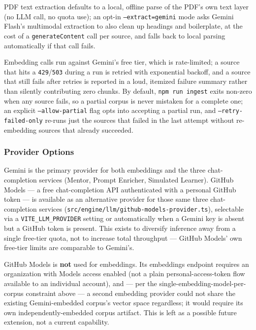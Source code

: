 \documentclass[10pt,letterpaper,twocolumn]{article}
\newcommand{\code}[1]{\texttt{\small #1}}
\begin{document}
PDF text extraction defaults to a local, offline parse of the PDF's own text layer (no LLM call, no quota use); an opt-in \code{--extract=gemini} mode asks Gemini Flash's multimodal extraction to also clean up headings and boilerplate, at the cost of a \code{generateContent} call per source, and falls back to local parsing automatically if that call fails.

Embedding calls run against Gemini's free tier, which is rate-limited; a source that hits a \code{429}/\code{503} during a run is retried with exponential backoff, and a source that still fails after retries is reported in a loud, itemized failure summary rather than silently contributing zero chunks. By default, \code{npm run ingest} exits non-zero when any source fails, so a partial corpus is never mistaken for a complete one; an explicit \code{--allow-partial} flag opts into accepting a partial run, and \code{--retry-failed-only} re-runs just the sources that failed in the last attempt without re-embedding sources that already succeeded.

\subsubsection{Provider Options}
\label{sec:provider-options}

Gemini is the primary provider for both embeddings and the three chat-completion services (Mentor, Prompt Enricher, Simulated Learner). GitHub Models --- a free chat-completion API authenticated with a personal GitHub token --- is available as an alternative provider for those same three chat-completion services (\code{src/engine/llm/github-models-provider.ts}), selectable via a \code{VITE\_LLM\_PROVIDER} setting or automatically when a Gemini key is absent but a GitHub token is present. This exists to diversify inference away from a single free-tier quota, not to increase total throughput --- GitHub Models' own free-tier limits are comparable to Gemini's.

GitHub Models is \textbf{not} used for embeddings. Its embeddings endpoint requires an organization with Models access enabled (not a plain personal-access-token flow available to an individual account), and --- per the single-embedding-model-per-corpus constraint above --- a second embedding provider could not share the existing Gemini-embedded corpus's vector space regardless; it would require its own independently-embedded corpus artifact. This is left as a possible future extension, not a current capability.
\end{document}
